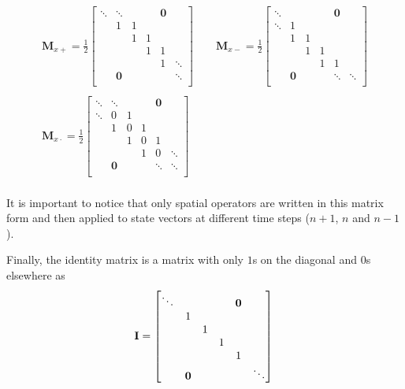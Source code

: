 \begin{gather*}
    \mathbf{M}_{x+} = \frac{1}{2}\begin{bmatrix}
        \ddots &\ddots & & & \mathbf{0}&\\
         & 1 & 1 & & & \\
        & & 1 & 1 & & \\
        & & & 1 & 1 & \\
        & & & & 1 & \ddots\\
        &\mathbf{0} & & & & \ddots \\
    \end{bmatrix}
    \qquad
    \mathbf{M}_{x-} = \frac{1}{2}\begin{bmatrix}
        \ddots & & & & \mathbf{0}&\\
        \ddots & 1 & & & & \\
        & 1 & 1 & & & \\
        & & 1 & 1 & & \\
        & & & 1 & 1 & \\
        &\mathbf{0} & & & \ddots & \ddots \\
    \end{bmatrix}\\
    \\
    \mathbf{M}_{x\cdot} = \frac{1}{2}\begin{bmatrix}
        \ddots &\ddots & & & \mathbf{0}&\\
        \ddots & 0 & 1 & & & \\
        & 1 & 0 & 1 & & \\
        & & 1 & 0 & 1 & \\
        & & & 1 & 0 & \ddots \\
        &\mathbf{0} & & & \ddots & \ddots \\
    \end{bmatrix}\\
\end{gather*}

It is important to notice that only spatial operators are written in this matrix form and then applied to state vectors at different time steps ($n+1$, $n$ and $n-1$). 

Finally, the identity matrix is a matrix with only $1$s on the diagonal and $0$s elsewhere as
\begin{equation}
    \mathbf{I} = \begin{bmatrix}
        \ddots & & & & \mathbf{0}&\\
         & 1 & & & & \\
        & & 1 & & & \\
        & & & 1 & & \\
        & & & & 1 & \\
        &\mathbf{0} & & &  & \ddots \\
    \end{bmatrix}\\
\end{equation}
